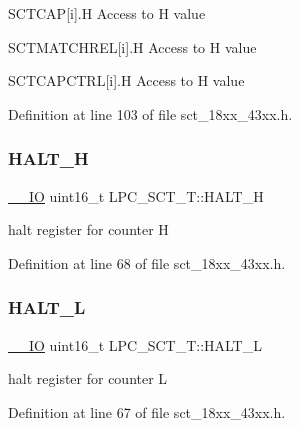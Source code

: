 S\+C\+T\+C\+AP\mbox{[}i\mbox{]}.H Access to H value

S\+C\+T\+M\+A\+T\+C\+H\+R\+EL\mbox{[}i\mbox{]}.H Access to H value

S\+C\+T\+C\+A\+P\+C\+T\+RL\mbox{[}i\mbox{]}.H Access to H value 

Definition at line 103 of file sct\+\_\+18xx\+\_\+43xx.\+h.

\mbox{\label{struct_l_p_c___s_c_t___t_a3e6765b5f5e9e30ee34b50e4e183d91d}} 
\subsubsection{\texorpdfstring{H\+A\+L\+T\+\_\+H}{HALT\_H}}
{\footnotesize\ttfamily \hyperlink{core__sc300_8h_aec43007d9998a0a0e01faede4133d6be}{\+\_\+\+\_\+\+IO} uint16\+\_\+t L\+P\+C\+\_\+\+S\+C\+T\+\_\+\+T\+::\+H\+A\+L\+T\+\_\+H}

halt register for counter H 

Definition at line 68 of file sct\+\_\+18xx\+\_\+43xx.\+h.

\mbox{\label{struct_l_p_c___s_c_t___t_a685974a8aebf70fa0134e94280601832}} 
\subsubsection{\texorpdfstring{H\+A\+L\+T\+\_\+L}{HALT\_L}}
{\footnotesize\ttfamily \hyperlink{core__sc300_8h_aec43007d9998a0a0e01faede4133d6be}{\+\_\+\+\_\+\+IO} uint16\+\_\+t L\+P\+C\+\_\+\+S\+C\+T\+\_\+\+T\+::\+H\+A\+L\+T\+\_\+L}

halt register for counter L 

Definition at line 67 of file sct\+\_\+18xx\+\_\+43xx.\+h.

\mbox{\label{struct_l_p_c___s_c_t___t_a057c856e4e94b50a51acc0db16e390fd}} 
